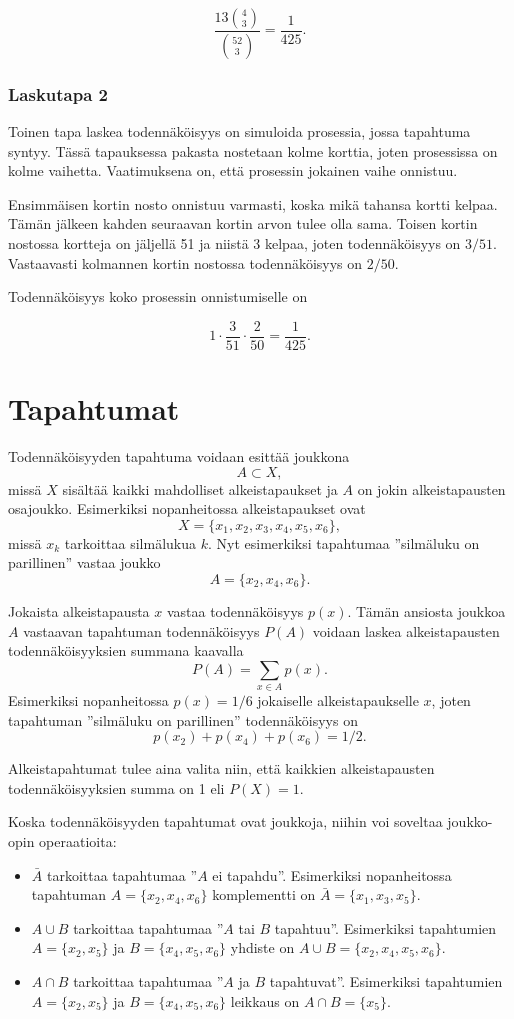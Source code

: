 \[\frac{13 {4 \choose 3}}{{52 \choose 3}} = \frac{1}{425}.\]

\subsubsection*{Laskutapa 2}

Toinen tapa laskea todennäköisyys on simuloida prosessia,
jossa tapahtuma syntyy.
Tässä tapauksessa pakasta nostetaan kolme korttia,
joten prosessissa on kolme vaihetta.
Vaatimuksena on, että prosessin jokainen vaihe onnistuu.

Ensimmäisen kortin nosto onnistuu varmasti,
koska mikä tahansa kortti kelpaa.
Tämän jälkeen kahden seuraavan kortin
arvon tulee olla sama.
Toisen kortin nostossa kortteja on jäljellä 51
ja niistä 3 kelpaa, joten todennäköisyys on $3/51$.
Vastaavasti kolmannen kortin nostossa
todennäköisyys on $2/50$.

Todennäköisyys koko prosessin onnistumiselle on

\[1 \cdot \frac{3}{51} \cdot \frac{2}{50} = \frac{1}{425}.\]

\section{Tapahtumat}

Todennäköisyyden tapahtuma
voidaan esittää joukkona
\[A \subset X,\]
missä $X$ sisältää kaikki mahdolliset alkeistapaukset
ja $A$ on jokin alkeistapausten osajoukko.
Esimerkiksi nopanheitossa alkeistapaukset ovat
\[X = \{x_1,x_2,x_3,x_4,x_5,x_6\},\]
missä $x_k$ tarkoittaa silmälukua $k$.
Nyt esimerkiksi tapahtumaa ''silmäluku on parillinen''
vastaa joukko
\[A = \{x_2,x_4,x_6\}.\]

Jokaista alkeistapausta $x$
vastaa todennäköisyys $p(x)$.
Tämän ansiosta joukkoa $A$ vastaavan tapahtuman
todennäköisyys $P(A)$ voidaan
laskea alkeistapausten todennäköisyyksien
summana kaavalla
\[P(A) = \sum_{x \in A} p(x).\]
Esimerkiksi nopanheitossa $p(x)=1/6$
jokaiselle alkeistapaukselle $x$, joten
tapahtuman ''silmäluku on parillinen''
todennäköisyys on
\[p(x_2)+p(x_4)+p(x_6)=1/2.\]

Alkeistapahtumat tulee aina valita niin,
että kaikkien alkeistapausten
todennäköisyyksien summa on 1 eli $P(X)=1$.

Koska todennäköisyyden tapahtumat ovat joukkoja,
niihin voi soveltaa jouk\-ko-opin operaatioita:

\begin{itemize}
\item {} $\bar A$ tarkoittaa
tapahtumaa ''$A$ ei tapahdu''. 
Esimerkiksi nopanheitossa tapahtuman
$A=\{x_2,x_4,x_6\}$ komplementti on
$\bar A = \{x_1,x_3,x_5\}$.
\item {} $A \cup B$ tarkoittaa
tapahtumaa ''$A$ tai $B$ tapahtuu''.
Esimerkiksi tapahtumien $A=\{x_2,x_5\}$
ja $B=\{x_4,x_5,x_6\}$ yhdiste on
$A \cup B = \{x_2,x_4,x_5,x_6\}$.
\item {} $A \cap B$ tarkoittaa
tapahtumaa ''$A$ ja $B$ tapahtuvat''.
Esimerkiksi tapahtumien $A=\{x_2,x_5\}$
ja $B=\{x_4,x_5,x_6\}$ leikkaus on
$A \cap B = \{x_5\}$.
\end{itemize}

